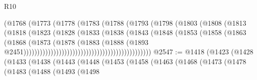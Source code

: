 \begin{lexlean}{R10}
\begin{coremodule}
                                              (@1768
                                                (@1773
                                                  (@1778
                                                    (@1783
                                                      (@1788
                                                        (@1793
                                                          (@1798
                                                            (@1803
                                                              (@1808
                                                                (@1813
                                                                  (@1818
                                                                    (@1823
                                                                      (@1828
                                                                        (@1833
                                                                          (@1838
                                                                            (@1843
                                                                              (@1848
                                                                                (@1853
                                                                                  (@1858
                                                                                    (@1863
                                                                                      (@1868
                                                                                        (@1873
                                                                                          (@1878
                                                                                            (@1883
                                                                                              (@1888
                                                                                                (@1893
                                                                                                  @2451)))))))))))))))))))))))))))))))))))))))))))))))
@2547 := @1418
    (@1423
      (@1428
        (@1433
          (@1438
            (@1443
              (@1448
                (@1453
                  (@1458
                    (@1463
                      (@1468
                        (@1473
                          (@1478
                            (@1483
                              (@1488
                                (@1493
                                  (@1498

\end{coremodule}
\end{lexlean}

